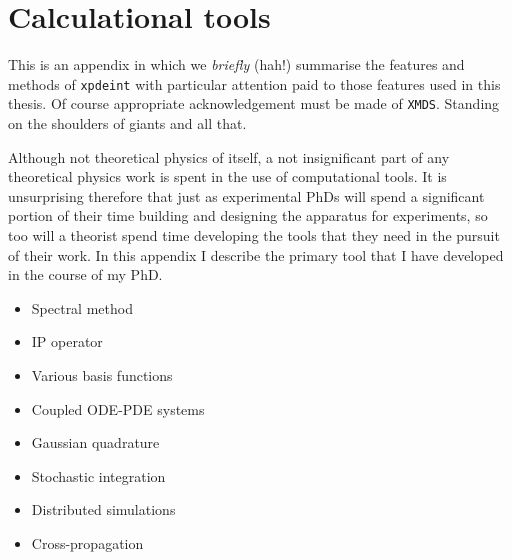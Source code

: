 \chapter{Calculational tools}
\label{ToolsAppendix}
\graphicspath{{Figures/ToolsAppendix/}{Figures/Common/}}

This is an appendix in which we \emph{briefly} (hah!) summarise the features and methods of \texttt{xpdeint} with particular attention paid to those features used in this thesis. Of course appropriate acknowledgement must be made of \texttt{XMDS}. Standing on the shoulders of giants and all that.

Although not theoretical physics of itself, a not insignificant part of any theoretical physics work is spent in the use of computational tools. It is unsurprising therefore that just as experimental PhDs will spend a significant portion of their time building and designing the apparatus for experiments, so too will a theorist spend time developing the tools that they need in the pursuit of their work. In this appendix I describe the primary tool that I have developed in the course of my PhD. %


\begin{itemize}
    \item Spectral method
    \item IP operator
    \item Various basis functions
    \item Coupled ODE-PDE systems
    \item Gaussian quadrature
    \item Stochastic integration
    \item Distributed simulations
    \item Cross-propagation
\end{itemize}